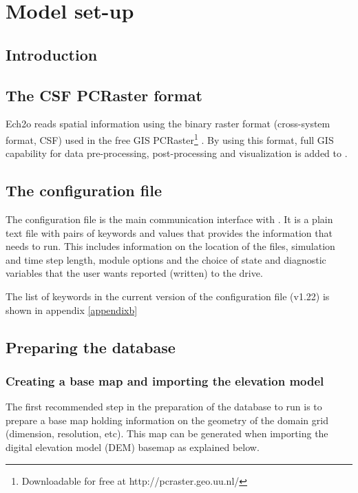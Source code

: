 \chapter{Model set-up}

\section{Introduction}

\section{The CSF PCRaster format}

Ech2o reads spatial information using the binary raster format (cross-system format, CSF) used in the free GIS PCRaster\footnote{Downloadable for free at http://pcraster.geo.uu.nl/} . By using this format, full GIS capability for data pre-processing, post-processing and visualization is added to \echo.

\section{The configuration file}

The configuration file is the main communication interface with \echo. It is a plain text file with pairs of keywords and values that provides the information that \echo needs to run. This includes information on the location of the files, simulation and time step length, module options and the choice of state and diagnostic variables that the user wants reported (written) to the drive.

The list of keywords in the current version of the configuration file (v1.22) is shown in appendix \ref{appendixb}


\section{Preparing the database}
\subsection{Creating a base map and importing the elevation model}

The first recommended step in the preparation of the database to run \echo is to prepare a base map holding information on the geometry of the domain grid (dimension, resolution, etc). This map can be generated when importing the digital elevation model (DEM) basemap as explained below.

